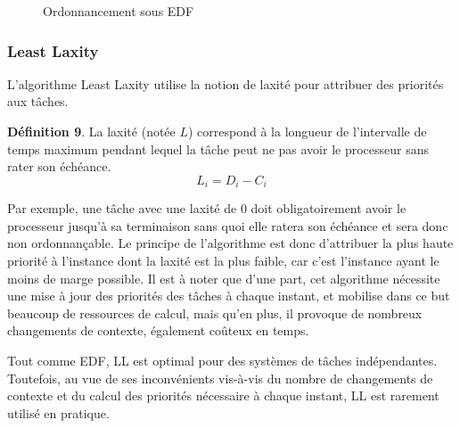 \begin{figure}[h]
\begin{center}
\begin{RTGrid}[height=4cm,width=12cm,labelsize=8pt,numbersize=6]{2}{16}




\end{RTGrid}
\caption{Ordonnancement sous EDF} \label{fig:exempleEDF}
\end{center}
\end{figure}
\vspace{1cm}

\subsubsection{Least Laxity}
\vspace{-1cm}
L'algorithme Least Laxity \cite{Mok83}utilise la notion de laxité pour attribuer des priorités aux tâches.

\textbf{Définition 9}. La laxité (notée $L$) correspond à la longueur de l'intervalle de temps maximum pendant lequel la tâche peut ne pas avoir le processeur sans rater son échéance.
\begin{equation}
L_i = D_i - C_i
\end{equation}

Par exemple, une tâche avec une laxité de 0 doit obligatoirement avoir le processeur jusqu'à sa terminaison sans quoi elle ratera son échéance et sera donc non ordonnançable.
Le principe de l'algorithme est donc d'attribuer la plus haute priorité à l'instance dont la laxité est la plus faible, car c'est l'instance ayant le moins de marge possible. 
Il est à noter que d'une part, cet algorithme nécessite une mise à jour des priorités des tâches à chaque instant, et mobilise dans ce but beaucoup de ressources de calcul, 
mais qu'en plus, il provoque de nombreux changements de contexte, également coûteux en temps.
\begin{theoreme}
Tout comme EDF, LL est optimal pour des systèmes de tâches indépendantes. Toutefois, au vue de ses inconvénients vis-à-vis du nombre de changements de contexte et du calcul 
des priorités nécessaire à chaque instant, LL est rarement utilisé en pratique.
\end{theoreme}

